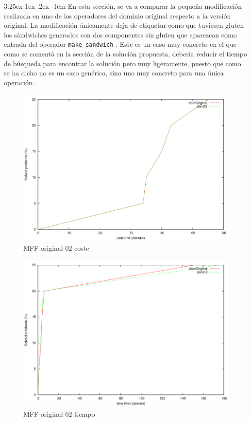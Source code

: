 \documentclass{article}
\makeatletter
\newcommand{\cool}[1] {
        {\texttt{#1}}
    }
\renewcommand\paragraph{\@startsection{paragraph}{5}{\z@}%
      {3.25ex \@plus1ex \@minus.2ex}%
      {-1em}%
      {\normalfont\normalsize\bfseries}}
\makeatother
\begin{document}
    \paragraph{}
    En esta sección, se va a comparar la pequeña modificación realizada en uno de los operadores del dominio original respecto a la versión original. La modificación únicamente deja de etiquetar como que tuviesen gluten los sándwiches generados con dos componentes sin gluten que aparezcan como entrada del operador \cool{make\_sandwich}. Este es un caso muy concreto en el que como se comentó en la sección de la solución propuesta, debería reducir el tiempo de búsqueda para encontrar la solución pero muy ligeramente, puesto que como se ha dicho no es un caso genérico, sino uno muy concreto para una única operación.
    
    \begin{figure}[H]
        \centering
        \includegraphics[width=12cm, height=8cm]{mff-or-02-cost}
        \caption{MFF-original-02-coste}
    \end{figure}
    
    \begin{figure}[H]
        \centering
        \includegraphics[width=12cm, height=8cm]{mff-or-02-time}
        \caption{MFF-original-02-tiempo}
    \end{figure}
    
\end{document}
